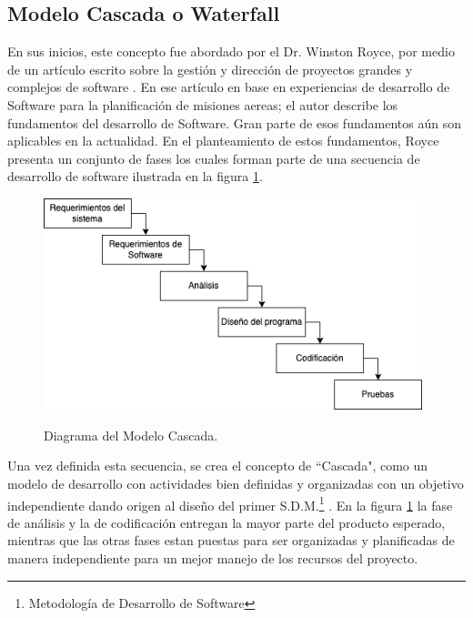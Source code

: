 \subsection{Modelo Cascada o Waterfall}
En sus inicios, este concepto fue abordado por el Dr. Winston Royce, por medio de un artículo escrito sobre la gestión y dirección de proyectos grandes y complejos de software \cite{Winston}. En ese artículo en base en experiencias de desarrollo de Software para la planificación de misiones aereas; el autor describe los fundamentos del desarrollo de Software. Gran parte de esos fundamentos aún son aplicables en la actualidad. En el planteamiento de estos fundamentos, Royce presenta un conjunto de fases los cuales forman parte de una secuencia de desarrollo de software ilustrada en la figura \ref{fig:cascada}.\\

\begin{figure}[H]
    \begin{center}
        \includegraphics[width=11cm]{img/capitulo_2/cascada2.png}
    \end{center}
    \begin{center}
        \caption{Diagrama del Modelo Cascada.}
        \label{fig:cascada}
    \end{center}
\end{figure}

Una vez definida esta secuencia, se crea el concepto de ``Cascada", como un modelo de desarrollo con actividades bien definidas y organizadas con un objetivo independiente dando origen al diseño del primer S.D.M.\footnote{Metodología de Desarrollo de Software} \cite{Bell&Thayer}. En la figura \ref{fig:cascada} la fase de análisis y la de codificación entregan la mayor parte del producto esperado, mientras que las otras fases estan puestas para ser organizadas y planificadas de manera independiente para un mejor manejo de los recursos del proyecto.\\

